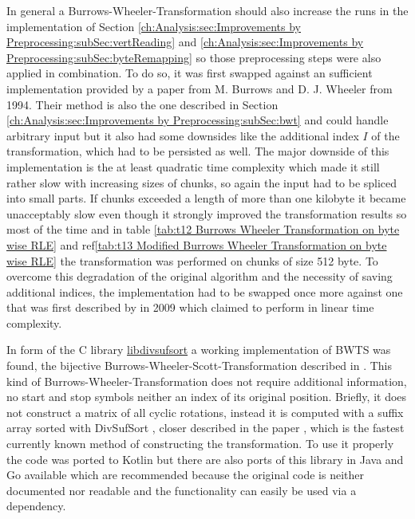 \par{
In general a Burrows-Wheeler-Transformation should also increase the runs in the implementation of Section \ref{ch:Analysis:sec:Improvements by Preprocessing:subSec:vertReading} and \ref{ch:Analysis:sec:Improvements by Preprocessing:subSec:byteRemapping} so those preprocessing steps were also applied in combination. To do so, it was first swapped against an sufficient implementation provided by a paper from M. Burrows and D. J. Wheeler \cite{Burrows94} from 1994. Their method is also the one described in Section \ref{ch:Analysis:sec:Improvements by Preprocessing:subSec:bwt} and could handle arbitrary input but it also had some downsides like the additional index $I$ of the transformation, which had to be persisted as well. The major downside of this implementation is the at least quadratic time complexity which made it still rather slow with increasing sizes of chunks, so again the input had to be spliced into small parts. If chunks exceeded a length of more than one kilobyte it became unacceptably slow even though it strongly improved the transformation results so most of the time and in table \ref{tab:t12 Burrows Wheeler Transformation on byte wise RLE} and ref\ref{tab:t13 Modified Burrows Wheeler Transformation on byte wise RLE} the transformation was performed on chunks of size 512 byte. To overcome this degradation of the original algorithm and the necessity of saving  additional indices, the implementation had to be swapped once more against one that was first described by \cite{Burrows-linear-time} in 2009 which claimed to perform in linear time complexity.
}
\par{
In form of the C library \href{https://code.google.com/archive/p/libdivsufsort}{libdivsufsort} a working implementation of BWTS was found, the bijective Burrows-Wheeler-Scott-Transformation described in \cite{DBLP:journals/corr/abs-1201-3077}. This kind of Burrows-Wheeler-Transformation does not require additional information, no start and stop symbols neither an index of its original position. Briefly, it does not construct a matrix of all cyclic rotations, instead it is computed with a suffix array sorted with DivSufSort \cite{LibDivSufSort}, closer described in the paper \cite{DBLP:journals/corr/abs-1710-01896}, which is the fastest currently known method of constructing the transformation. To use it properly the code was ported to Kotlin but there are also ports of this library in Java and Go available which are recommended because the original code is neither documented nor readable and the functionality can easily be used via a dependency.
}

